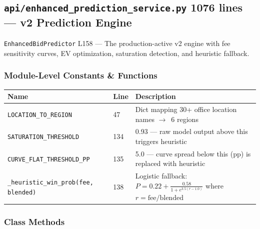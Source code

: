 \documentclass[11pt,a4paper]{article}
\newcommand{\file}[1]{\texttt{\color{gssblue!70!black}#1}}
\newcommand{\func}[1]{\texttt{\color{gssgreen!80!black}#1}}
\newcommand{\cls}[1]{\texttt{\color{uipurple}#1}}
\newcommand{\lineref}[1]{\textcolor{gssgray}{\small L#1}}
\newcommand{\arrow}{$\rightarrow$}
\newcommand{\apitag}[1]{\colorbox{apigreen!15}{\small\textcolor{apigreen}{\textbf{#1}}}}
\begin{document}
\subsection{\file{api/enhanced\_prediction\_service.py} \apitag{1076 lines} --- v2 Prediction Engine}

\cls{EnhancedBidPredictor} \lineref{158} --- The production-active v2 engine with fee
sensitivity curves, EV optimization, saturation detection, and heuristic fallback.

\subsubsection{Module-Level Constants \& Functions}

\begin{longtable}{l l p{7.5cm}}
\toprule
\textbf{Name} & \textbf{Line} & \textbf{Description} \\
\midrule
\endhead
\texttt{LOCATION\_TO\_REGION} & 47 & Dict mapping 30+ office location names \arrow\ 6 regions \\
\texttt{SATURATION\_THRESHOLD} & 134 & 0.93 --- raw model output above this triggers heuristic \\
\texttt{CURVE\_FLAT\_THRESHOLD\_PP} & 135 & 5.0 --- curve spread below this (pp) is replaced with heuristic \\
\func{\_heuristic\_win\_prob(fee, blended)} & 138 & Logistic fallback: $P = 0.22 + \frac{0.58}{1 + e^{3.5(r - 1.0)}}$ where $r = \text{fee}/\text{blended}$ \\
\bottomrule
\end{longtable}

\subsubsection{Class Methods}
\end{document}
